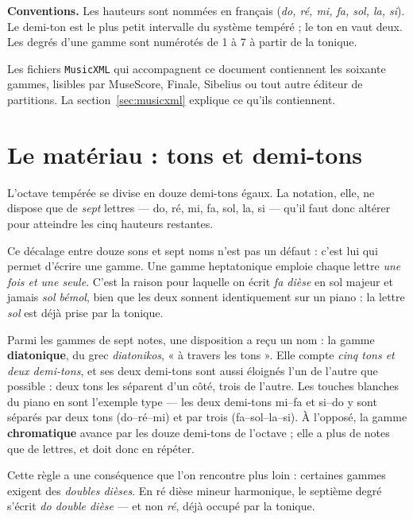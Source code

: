 \documentclass[a4paper,11pt]{article}
\begin{document}
\begin{remarque}
\textbf{Conventions.} Les hauteurs sont nommées en français
(\emph{do, ré, mi, fa, sol, la, si}). Le demi-ton est le plus petit
intervalle du système tempéré ; le ton en vaut deux. Les degrés d'une gamme
sont numérotés de 1 à 7 à partir de la tonique.
\end{remarque}

Les fichiers \texttt{MusicXML} qui accompagnent ce document contiennent les
soixante gammes, lisibles par MuseScore, Finale, Sibelius ou tout autre
éditeur de partitions. La section~\ref{sec:musicxml} explique ce qu'ils
contiennent.

\section{Le matériau : tons et demi-tons}
\label{sec:materiau}

L'octave tempérée se divise en douze demi-tons égaux. La notation, elle,
ne dispose que de \emph{sept} lettres — do, ré, mi, fa, sol, la, si — qu'il
faut donc altérer pour atteindre les cinq hauteurs restantes.

Ce décalage entre douze sons et sept noms n'est pas un défaut : c'est lui qui
permet d'écrire une gamme. Une gamme heptatonique emploie chaque lettre
\emph{une fois et une seule}. C'est la raison pour laquelle on écrit
\emph{fa dièse} en sol majeur et jamais \emph{sol bémol}, bien que les deux
sonnent identiquement sur un piano : la lettre \emph{sol} est déjà prise par
la tonique.

Parmi les gammes de sept notes, une disposition a reçu un nom : la gamme
\textbf{diatonique}, du grec \emph{diatonikos}, « à travers les tons ». Elle
compte \emph{cinq tons et deux demi-tons}, et ses deux demi-tons sont aussi
éloignés l'un de l'autre que possible : deux tons les séparent d'un côté,
trois de l'autre. Les touches blanches du piano en sont l'exemple type — les
deux demi-tons mi--fa et si--do y sont séparés par deux tons (do--ré--mi) et
par trois (fa--sol--la--si). À l'opposé, la gamme \textbf{chromatique}
avance par les douze demi-tons de l'octave ; elle a plus de notes que de
lettres, et doit donc en répéter.

\begin{remarque}
Cette règle a une conséquence que l'on rencontre plus loin : certaines
gammes exigent des \emph{doubles dièses}. En ré dièse mineur harmonique, le
septième degré s'écrit \emph{do double dièse} — et non \emph{ré}, déjà
occupé par la tonique.
\end{remarque}
\end{document}
